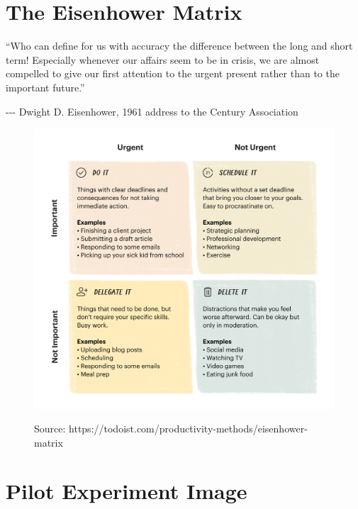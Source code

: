 \documentclass[
]{report}
\begin{document}
\hypertarget{app-eisenhower}{%
\section{The Eisenhower Matrix}\label{app-eisenhower}}

``Who can define for us with accuracy the difference between the long
and short term! Especially whenever our affairs seem to be in crisis, we
are almost compelled to give our first attention to the urgent present
rather than to the important future.''

-\/-\/- Dwight D. Eisenhower, 1961 address to the Century Association

\begin{figure}

{\centering 

\href{https://todoist.com/productivity-methods/eisenhower-matrix}{\includegraphics[width=5.36in,height=\textheight]{images/eisenhower-matrix.png}}

}

\caption{Source:
https://todoist.com/productivity-methods/eisenhower-matrix}

\end{figure}

\hypertarget{pilot-experiment-image}{%
\section{Pilot Experiment Image}\label{pilot-experiment-image}}
\end{document}
